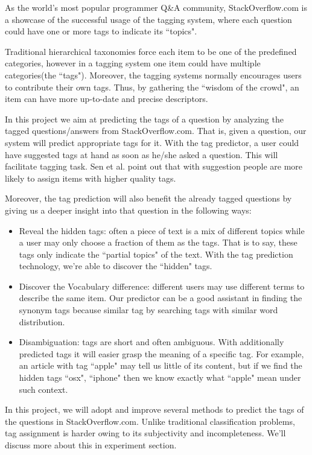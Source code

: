 
As the world's most popular programmer Q\&A community, StackOverflow.com is a showcase of the successful usage of the tagging system, where each question could have one or more tags to indicate its ``topics". 

Traditional hierarchical taxonomies force each item to be one of the predefined categories, however in a tagging system one item could have multiple categories(the ``tags"). Moreover, the tagging systems normally encourages users to contribute their own tags. Thus, by gathering the ``wisdom of the crowd", an item can have more up-to-date and precise descriptors.

In this project we aim at predicting the tags of a question by analyzing the tagged questions/answers from StackOverflow.com. That is, given a question, our system will predict appropriate tags for it. With the tag predictor, a user could have suggested tags at hand as soon as he/she asked a question. This will facilitate tagging task. Sen et al.\cite{Sen2006} point out that with suggestion people are more likely to assign items with higher quality tags.

Moreover, the tag prediction will also benefit the already tagged questions by giving us a deeper insight into that question in the following ways:

\begin{itemize}
    \item Reveal the hidden tags: often a piece of text is a mix of different topics while a user may only choose a fraction of them as the tags. That is to say, these tags only indicate the ``partial topics" of the text. With the tag prediction technology, we're able to discover the ``hidden" tags.
    \item Discover the Vocabulary difference: different users may use different terms to describe the same item. Our predictor can be a good assistant in finding the synonym tags because similar tag by searching tags with similar word distribution.
    \item Disambiguation: tags are short and often ambiguous. With additionally predicted tags it will easier grasp the meaning of a specific tag. For example, an article with tag ``apple" may tell us little of its content, but if we find the hidden tags ``osx", ``iphone" then we know exactly what ``apple" mean under such context.
\end{itemize}

In this project, we will adopt and improve several methods to predict the tags of the questions in StackOverflow.com. Unlike traditional classification problems, tag assignment is harder owing to its subjectivity and incompleteness. We'll discuss more about this in experiment section.
